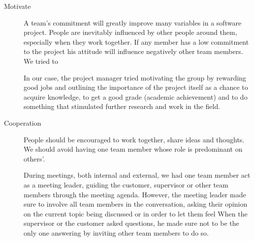 \begin{description}

\item[Motivate]
A team's commitment will greatly improve many variables in a software project.
People are inevitably influenced by other people around them, especially when they work together.
If any member has a low commitment to the project his attitude will influence negatively other team members.
We tried to 




In our case, the project manager tried motivating the group by rewarding good jobs
and outlining the importance of the project itself as a chance to acquire knowledge,
to get a good grade (academic achievement) and to do something that stimulated further
research and work in the field.

\item[Cooperation]
People should be encouraged to work together, share ideas and thoughts.
We should avoid having one team member whose role is predominant on others'.

During meetings, both internal and external, we had one team member
act as a meeting leader, guiding the customer, supervisor or other team members through
the meeting agenda. However, the meeting leader made sure to involve all team members
in the conversation, asking their opinion on the current topic being discussed
or in order to let them feel
When the supervisor or the customer asked questions, he made sure not to be the only one
answering by inviting other team members to do so.


\end{description}
